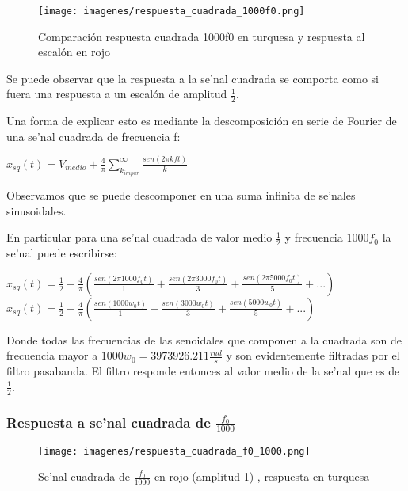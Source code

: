 \documentclass[12pt, titlepage]{article}
\begin{document}
     \begin{figure}[!htb]
     \texttt{[image: imagenes/respuesta\_cuadrada\_1000f0.png]}
     \centering
     \caption{Comparación respuesta cuadrada 1000f0 en turquesa y respuesta al escalón en rojo}
    \end{figure}
    
    Se puede observar que la respuesta a la se'nal cuadrada se comporta como si fuera una respuesta a un escalón de amplitud $\frac{1}{2}$. 
    
    Una forma de explicar esto es mediante la descomposición en serie de Fourier de una se'nal cuadrada de frecuencia f:
    \begin{center}
        $x_{sq}(t) = V_{medio} + \frac{4}{\pi}\sum_{k_{impar}}^{\infty} \frac{sen(2\pi kft)}{k}$
    \end{center}
    
    Observamos que se puede descomponer en una suma infinita de se'nales sinusoidales.
    
    En particular para una se'nal cuadrada de valor medio $\frac{1}{2}$ y frecuencia $1000f_0$ la se'nal puede escribirse:
     \begin{center}
        $x_{sq}(t) = \frac{1}{2} + \frac{4}{\pi} (\frac{sen(2\pi 1000f_{0}t)}{1} + \frac{sen(2\pi 3000f_{0}t)}{3} + \frac{sen(2\pi 5000f_{0}t)}{5} +...)$\\
        \vspace{5mm}
        $x_{sq}(t) = \frac{1}{2} + \frac{4}{\pi} (\frac{sen(1000w_0t)}{1} + \frac{sen(3000w_{0}t)}{3} + \frac{sen(5000w_{0}t)}{5} +...)$
    \end{center}

    Donde todas las frecuencias de las senoidales que componen a la cuadrada son de frecuencia mayor a $1000w_0 = 3973926.211\frac{rad}{s}$ y son evidentemente filtradas por el filtro pasabanda. El filtro responde entonces al valor medio de la se'nal que es de $\frac{1}{2}$.

    \subsubsection{Respuesta a se'nal cuadrada de $\frac{f_0}{1000}$}
    
    \begin{figure}[!htb]
     \texttt{[image: imagenes/respuesta\_cuadrada\_f0\_1000.png]}
     \centering
     \caption{Se'nal cuadrada de $\frac{f_0}{1000}$ en rojo (amplitud 1) , respuesta en turquesa}
    \end{figure}
\end{document}
